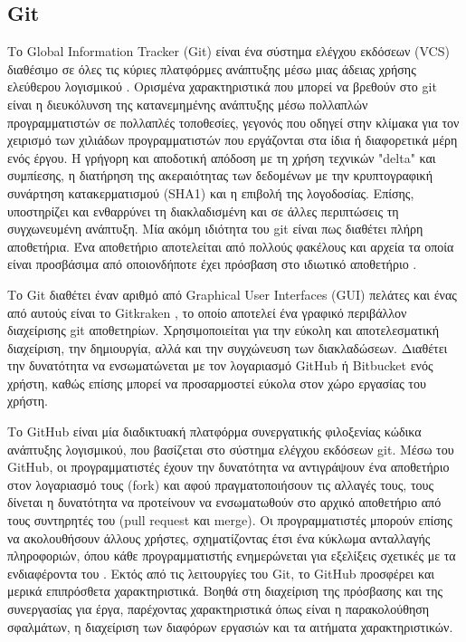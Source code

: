 \subsection{Git}
Το Global Information Tracker (Git) είναι ένα σύστημα ελέγχου εκδόσεων (VCS) διαθέσιμο σε όλες τις κύριες πλατφόρμες ανάπτυξης μέσω μιας άδειας χρήσης ελεύθερου λογισμικού \cite{spinellis2012git}. Ορισμένα χαρακτηριστικά που μπορεί να βρεθούν στο git είναι η διευκόλυνση της κατανεμημένης ανάπτυξης μέσω πολλαπλών προγραμματιστών σε πολλαπλές τοποθεσίες, γεγονός που οδηγεί στην κλίμακα για τον χειρισμό των χιλιάδων προγραμματιστών που εργάζονται στα ίδια ή διαφορετικά μέρη ενός έργου. Η γρήγορη και αποδοτική απόδοση με τη χρήση τεχνικών "delta" και συμπίεσης, η διατήρηση της ακεραιότητας των δεδομένων με την κρυπτογραφική συνάρτηση κατακερματισμού (SHA1) και η επιβολή της λογοδοσίας. Επίσης, υποστηρίζει και ενθαρρύνει τη διακλαδισμένη και σε άλλες περιπτώσεις τη συγχωνευμένη ανάπτυξη. Μία ακόμη ιδιότητα του git είναι πως διαθέτει πλήρη αποθετήρια. Ένα αποθετήριο αποτελείται από πολλούς φακέλους και αρχεία τα οποία είναι προσβάσιμα από οποιονδήποτε έχει πρόσβαση στο ιδιωτικό αποθετήριο \cite{loeliger2012version}. 

Το Git διαθέτει έναν αριθμό από Graphical User Interfaces (GUI) πελάτες και ένας από αυτούς είναι το Gitkraken \cite{gitkrakenwhatisit}, το οποίο αποτελεί ένα γραφικό περιβάλλον διαχείρισης git αποθετηρίων. Χρησιμοποιείται για την εύκολη και αποτελεσματική διαχείριση, την δημιουργία, αλλά και την συγχώνευση των διακλαδώσεων. Διαθέτει την δυνατότητα να ενσωματώνεται με τον λογαριασμό GitHub ή Bitbucket ενός χρήστη, καθώς επίσης μπορεί να προσαρμοστεί εύκολα στον χώρο εργασίας του χρήστη.

Το GitHub είναι μία διαδικτυακή πλατφόρμα συνεργατικής φιλοξενίας κώδικα ανάπτυξης λογισμικού, που βασίζεται στο σύστημα ελέγχου εκδόσεων git. Μέσω του GitHub, οι προγραμματιστές έχουν την δυνατότητα να αντιγράψουν ένα αποθετήριο στον λογαριασμό τους (fork) και αφού πραγματοποιήσουν τις αλλαγές τους, τους δίνεται η δυνατότητα να προτείνουν  να ενσωματωθούν στο αρχικό αποθετήριο από τους συντηρητές του (pull request και merge). Οι προγραμματιστές μπορούν επίσης να ακολουθήσουν άλλους χρήστες, σχηματίζοντας έτσι ένα κύκλωμα ανταλλαγής πληροφοριών, όπου κάθε προγραμματιστής ενημερώνεται για εξελίξεις σχετικές με τα ενδιαφέροντα του \cite{kalliamvakou2014promises}. Εκτός από τις λειτουργίες του Git, το GitHub προσφέρει και μερικά επιπρόσθετα χαρακτηριστικά. Βοηθά στη διαχείριση της πρόσβασης και της συνεργασίας για έργα, παρέχοντας χαρακτηριστικά όπως είναι η παρακολούθηση σφαλμάτων, η διαχείριση των διαφόρων εργασιών και τα αιτήματα χαρακτηριστικών.

